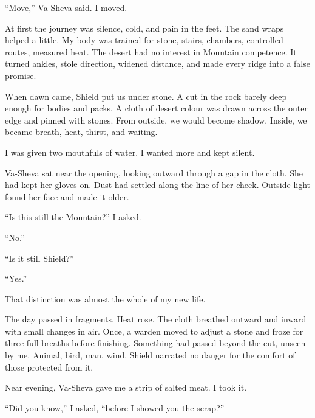 ``Move,'' Va-Sheva said. I moved.\par

At first the journey was silence, cold, and pain in the feet. The sand wraps helped a little. My body was trained for stone, stairs, chambers, controlled routes, measured heat. The desert had no interest in Mountain competence. It turned ankles, stole direction, widened distance, and made every ridge into a false promise.\par

When dawn came, Shield put us under stone. A cut in the rock barely deep enough for bodies and packs. A cloth of desert colour was drawn across the outer edge and pinned with stones. From outside, we would become shadow. Inside, we became breath, heat, thirst, and waiting.\par

I was given two mouthfuls of water. I wanted more and kept silent.\par

Va-Sheva sat near the opening, looking outward through a gap in the cloth. She had kept her gloves on. Dust had settled along the line of her cheek. Outside light found her face and made it older.\par

``Is this still the Mountain?'' I asked.\par

``No.''\par

``Is it still Shield?''\par

``Yes.''\par

That distinction was almost the whole of my new life.\par

The day passed in fragments. Heat rose. The cloth breathed outward and inward with small changes in air. Once, a warden moved to adjust a stone and froze for three full breaths before finishing. Something had passed beyond the cut, unseen by me. Animal, bird, man, wind. Shield narrated no danger for the comfort of those protected from it.\par

Near evening, Va-Sheva gave me a strip of salted meat. I took it.\par

``Did you know,'' I asked, ``before I showed you the scrap?''\par

